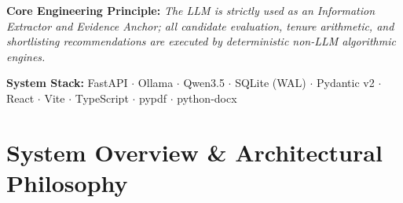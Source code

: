 \documentclass[11pt,a4paper]{report}
\begin{document}
\begin{titlepage}
\begin{center}
\begin{tcolorbox}[enhanced, colback=accentlight, colframe=accentdark, arc=3pt, width=0.96\textwidth, title=\textbf{Executive Technical Overview}]
    \vspace{0.2cm}
    \textbf{Core Engineering Principle:} \emph{The LLM is strictly used as an Information Extractor and Evidence Anchor; all candidate evaluation, tenure arithmetic, and shortlisting recommendations are executed by deterministic non-LLM algorithmic engines.}
    \end{tcolorbox}

    \vfill
    {\footnotesize \textbf{System Stack:} FastAPI $\cdot$ Ollama $\cdot$ Qwen3.5 $\cdot$ SQLite (WAL) $\cdot$ Pydantic v2 $\cdot$ React $\cdot$ Vite $\cdot$ TypeScript $\cdot$ pypdf $\cdot$ python-docx}
\end{center}
\end{titlepage}

\tableofcontents
\newpage

\chapter{System Overview \& Architectural Philosophy}
\end{document}
